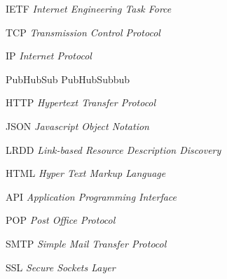 \begin{siglas}
  \item[IETF] \textit{Internet Engineering Task Force}
  \item[TCP] \textit{Transmission Control Protocol}
  \item[IP] \textit{Internet Protocol}
  \item[PubHubSub] PubHubSubbub
  \item[HTTP] \textit{Hypertext Transfer Protocol}
  \item[JSON] \textit{Javascript Object Notation}
  \item[LRDD] \textit{Link-based Resource Description Discovery}
  \item[HTML] \textit{Hyper Text Markup Language}
  \item[API] \textit{Application Programming Interface}
  \item[POP] \textit{Post Office Protocol}
  \item[SMTP] \textit{Simple Mail Transfer Protocol}
  \item[SSL] \textit{Secure Sockets Layer}
\end{siglas}
